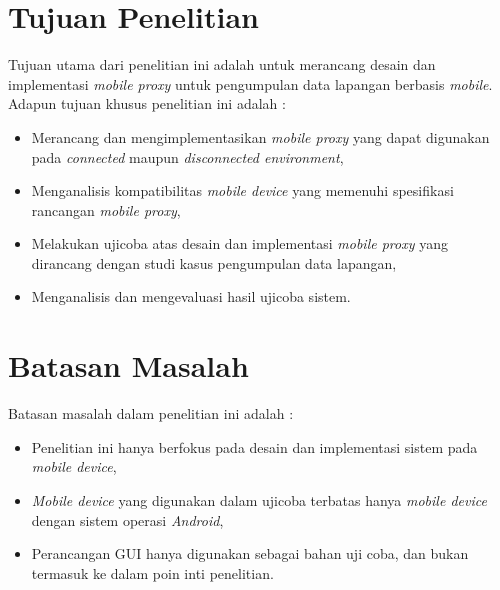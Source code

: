 \section{Tujuan Penelitian}
Tujuan utama dari penelitian ini adalah untuk merancang desain dan implementasi \textit{mobile proxy} untuk pengumpulan data lapangan berbasis \textit{mobile}. Adapun tujuan khusus penelitian ini adalah :
\begin{itemize}
\item Merancang dan mengimplementasikan \textit{mobile proxy} yang dapat digunakan pada \textit{connected} maupun \textit{disconnected environment},
\item Menganalisis kompatibilitas \textit{mobile device} yang memenuhi spesifikasi rancangan \textit{mobile proxy},
\item Melakukan ujicoba atas desain dan implementasi \textit{mobile proxy} yang dirancang dengan studi kasus pengumpulan data lapangan,
\item Menganalisis dan mengevaluasi hasil ujicoba sistem.
\end{itemize}

\section{Batasan Masalah}
Batasan masalah dalam penelitian ini adalah :
\begin{itemize}
\item Penelitian ini hanya berfokus pada desain dan implementasi sistem pada \textit{mobile device},
\item \textit{Mobile device} yang digunakan dalam ujicoba terbatas hanya \textit{mobile device} dengan sistem operasi \textit{Android},
\item Perancangan GUI hanya digunakan sebagai bahan uji coba, dan bukan termasuk ke dalam poin inti penelitian.
\end{itemize}


